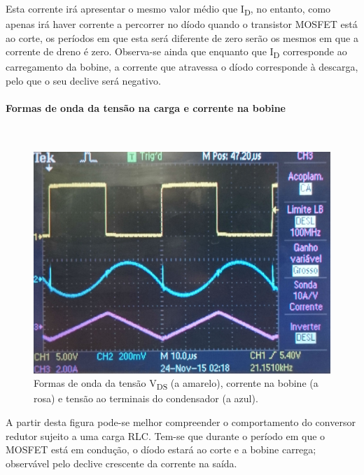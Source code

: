 \documentclass[a4paper,11pt]{article}
\numberwithin{equation}{section}
\begin{document}
Esta corrente irá apresentar o mesmo valor médio que I\textsubscript{D}, no entanto, como apenas irá haver corrente a percorrer no díodo quando o transistor MOSFET está ao corte, os períodos em que esta será diferente de zero serão os mesmos em que a corrente de dreno é zero. Observa-se ainda que enquanto que I\textsubscript{D} corresponde ao carregamento da bobine, a corrente que atravessa o díodo corresponde à descarga, pelo que o seu declive será negativo.

\pagebreak

\paragraph{Formas de onda da tensão na carga e corrente na bobine}\mbox{}\

\begin{figure}[H]
	\centering
	\includegraphics[keepaspectratio=true, scale=0.15]{img/figs/tensao_carga_corrente_bobine_ac_rlcbuck}
	\caption{Formas de onda da tensão V\textsubscript{DS} (a amarelo), corrente na bobine (a rosa) e tensão ao terminais do condensador (a azul).}
	\label{fig:tensao_carga_corrente_bobine_ac_rlcbuck}
	\vspace{-0.8em}
\end{figure} 


A partir desta figura pode-se melhor compreender o comportamento do conversor redutor sujeito a uma carga RLC. Tem-se que durante o período em que o MOSFET está em condução, o díodo estará ao corte e a bobine carrega; observável pelo declive crescente da corrente na saída. 
\end{document}
